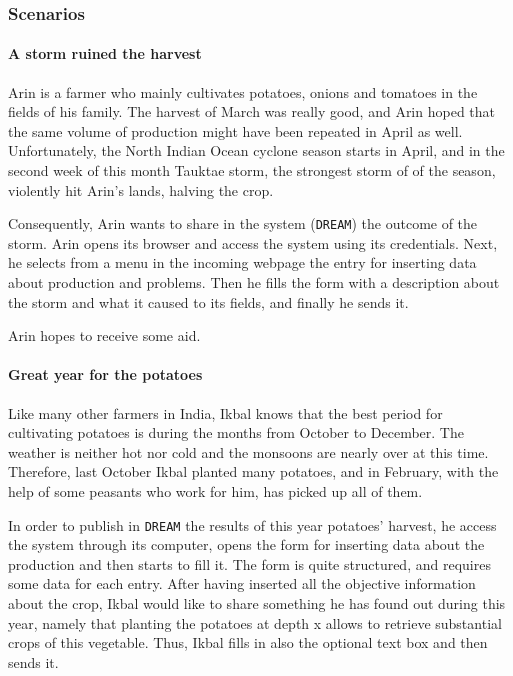 \documentclass{article}
\begin{document}
\subsubsection{Scenarios}
\paragraph{A storm ruined the harvest}
Arin is a farmer who mainly cultivates potatoes, onions and tomatoes in the fields of his family. The harvest of March was really good, and Arin hoped that the same volume of production might have been repeated in April as well. Unfortunately, the North Indian Ocean cyclone season starts in April, and in the second week of this month Tauktae storm, the strongest storm of of the season, violently hit Arin's lands, halving the crop.\par
\noindent Consequently, Arin wants to share in the system (\verb|DREAM|) the outcome of the storm. Arin opens its browser and access the system using its credentials. Next, he selects from a menu in the incoming webpage the entry for inserting data about production and problems. Then he fills the form with a description about the storm and what it caused to its fields, and finally he sends it.\par
\noindent Arin hopes to receive some aid.
\paragraph{Great year for the potatoes}
Like many other farmers in India, Ikbal knows that the best period for cultivating potatoes is during the months from October to December. The weather is neither hot nor cold and the monsoons are nearly over at this time. Therefore, last October Ikbal planted many potatoes, and in February, with the help of some peasants who work for him, has picked up all of them. \par
\noindent In order to publish in \verb|DREAM| the results of this year potatoes' harvest, he access the system through its computer, opens the form for inserting data about the production and then starts to fill it. The form is quite structured, and requires some data for each entry. After having inserted all the objective information about the crop, Ikbal would like to share something he has found out during this year, namely that planting the potatoes at depth x allows to retrieve substantial crops of this vegetable. Thus, Ikbal fills in also the optional text box and then sends it.
\end{document}
